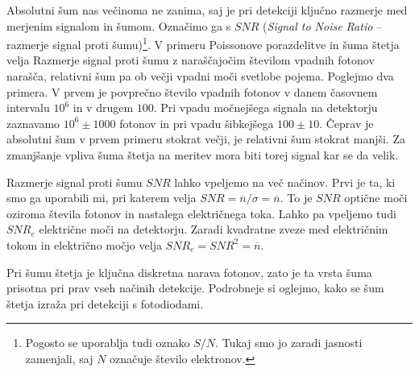 Absolutni šum nas večinoma ne zanima, 
saj je pri detekciji ključno razmerje med merjenim 
signalom in šumom. 
Označimo ga s $SNR$ ({\it Signal to Noise Ratio} --
razmerje 
signal proti šumu)\footnote{Pogosto se uporablja tudi oznako $S/N$. Tukaj smo jo 
zaradi jasnosti zamenjali, saj $N$ označuje število elektronov.}.
V primeru Poissonove porazdelitve in šuma štetja velja
Razmerje signal proti šumu z naraščajočim številom vpadnih fotonov narašča, 
relativni šum pa ob večji vpadni moči svetlobe pojema. 
Poglejmo dva primera. V prvem je povprečno število vpadnih 
fotonov v danem časovnem intervalu $10^6$ in v drugem $100$. 
Pri vpadu močnejšega signala 
na detektorju zaznavamo $10^6 \pm 1000$ fotonov in pri vpadu šibkejšega
$100 \pm 10$. Čeprav je absolutni šum v prvem primeru stokrat večji, 
je relativni šum stokrat manjši. Za zmanjšanje vpliva šuma štetja na meritev mora biti 
torej signal kar se da velik. 

\begin{remark}
Razmerje signal proti šumu $SNR$ lahko vpeljemo na več načinov. Prvi je ta, ki smo ga 
uporabili mi, pri katerem velja $SNR = \overline{n}/\sigma = \overline{n}$. To je
$SNR$ optične moči oziroma števila fotonov in nastalega električnega toka. Lahko
pa vpeljemo tudi $SNR_e$ električne moči na detektorju.
Zaradi kvadratne zveze med električnim tokom in električno močjo velja 
$SNR_e=SNR^2={\overline{n}}$.
\end{remark}

Pri šumu štetja je ključna diskretna narava fotonov, zato je ta vrsta šuma
prisotna pri prav vseh načinih detekcije. Podrobneje si oglejmo, 
kako se šum štetja izraža pri detekciji s fotodiodami. 

